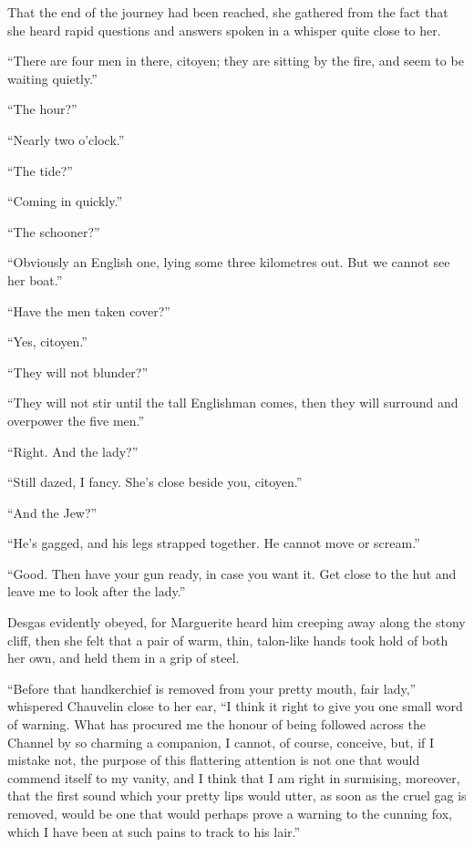 \documentclass[paper=a5,BCOR=7mm,twoside,DIV=calc,12pt,usegeometry,chapterprefix,endperiod,headings=big]{scrbook}
\begin{document}
That the end of the journey had been reached, she gathered from the fact that she heard rapid questions and answers spoken in a whisper quite close to her.

\enquote{There are four men in there, citoyen; they are sitting by the fire, and seem to be waiting quietly.}

\enquote{The hour?}

\enquote{Nearly two o'clock.}

\enquote{The tide?}

\enquote{Coming in quickly.}

\enquote{The schooner?}

\enquote{Obviously an English one, lying some three kilometres out. But we cannot see her boat.}

\enquote{Have the men taken cover?}

\enquote{Yes, citoyen.}

\enquote{They will not blunder?}

\enquote{They will not stir until the tall Englishman comes, then they will surround and overpower the five men.}

\enquote{Right. And the lady?}

\enquote{Still dazed, I fancy. She's close beside you, citoyen.}

\enquote{And the Jew?}

\enquote{He's gagged, and his legs strapped together. He cannot move or scream.}

\enquote{Good. Then have your gun ready, in case you want it. Get close to the hut and leave me to look after the lady.}

Desgas evidently obeyed, for Marguerite heard him creeping away along the stony cliff, then she felt that a pair of warm, thin, talon-like hands took hold of both her own, and held them in a grip of steel.

\enquote{Before that handkerchief is removed from your pretty mouth, fair lady,} whispered Chauvelin close to her ear, \enquote{I think it right to give you one small word of warning. What has procured me the honour of being followed across the Channel by so charming a companion, I cannot, of course, conceive, but, if I mistake not, the purpose of this flattering attention is not one that would commend itself to my vanity, and I think that I am right in surmising, moreover, that the first sound which your pretty lips would utter, as soon as the cruel gag is removed, would be one that would perhaps prove a warning to the cunning fox, which I have been at such pains to track to his lair.}
\end{document}
